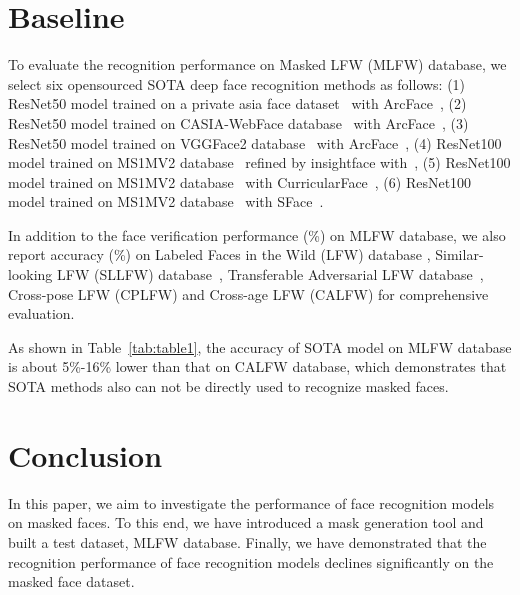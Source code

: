 \documentclass[final]{cvpr}
\begin{document}
\section{Baseline}
To evaluate the recognition performance on Masked LFW (MLFW) database, we select six opensourced SOTA deep face recognition methods as follows: (1) ResNet50 model trained on a private asia face dataset~\cite{wang2021face} with ArcFace~\cite{deng2019arcface}, (2) ResNet50 model trained on CASIA-WebFace database~\cite{Yi2014CASIA} with ArcFace~\cite{deng2019arcface}, (3) ResNet50 model trained on VGGFace2 database~\cite{cao2018vggface2} with ArcFace~\cite{deng2019arcface}, (4) ResNet100 model trained on MS1MV2 database~\cite{guo2016ms} refined by insightface with~\cite{deng2019arcface}, (5) ResNet100 model trained on MS1MV2 database~\cite{guo2016ms} with CurricularFace~\cite{huang2020curricularface}, (6) ResNet100 model trained on MS1MV2 database~\cite{guo2016ms} with SFace~\cite{zhong2021sface}.

In addition to the face verification performance (\%) on MLFW database, we also report accuracy (\%) on Labeled Faces in the Wild (LFW) database \cite{huang2008labeled}, Similar-looking LFW (SLLFW) database~\cite{deng2017fine}, Transferable Adversarial LFW database~\cite{zhong2020towards}, Cross-pose LFW (CPLFW) and Cross-age LFW (CALFW) for comprehensive evaluation.  

As shown in Table~\ref{tab:table1}, the accuracy of SOTA model on MLFW database is about 5\%-16\% lower than that on CALFW database, which demonstrates that SOTA methods also can not be directly used to recognize masked faces. 

\section{Conclusion}
In this paper, we aim to investigate the performance of face recognition models on masked faces. To this end, we have introduced a mask generation tool and built a test dataset, MLFW database. Finally, we have demonstrated that the recognition performance of face recognition models declines significantly on the masked face dataset.

{\small
	
	
}
\end{document}
